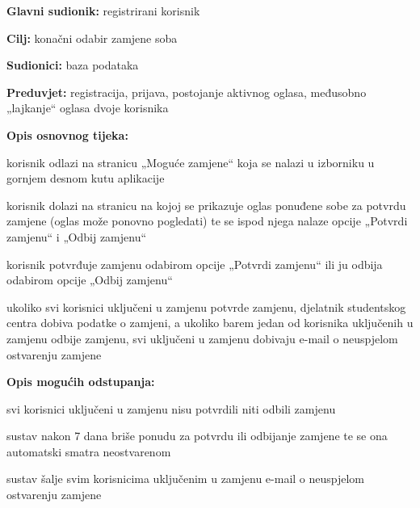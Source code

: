 \noindent {}
\begin{packed_item}
	
	\item \textbf{Glavni sudionik: } registrirani korisnik
	\item  \textbf{Cilj:}  konačni odabir zamjene soba
	\item  \textbf{Sudionici:} baza podataka
	\item  \textbf{Preduvjet:} registracija, prijava, postojanje aktivnog oglasa, međusobno „lajkanje“ oglasa dvoje korisnika
	\item  \textbf{Opis osnovnog tijeka:}
	
	\item[] \begin{packed_enum}
		
		\item korisnik odlazi na stranicu „Moguće zamjene“ koja se nalazi u izborniku u gornjem desnom kutu aplikacije
		\item korisnik dolazi na stranicu na kojoj se prikazuje oglas ponuđene sobe za potvrdu zamjene (oglas može ponovno pogledati) te se ispod njega nalaze opcije „Potvrdi zamjenu“ i „Odbij zamjenu“
		\item korisnik potvrđuje zamjenu odabirom opcije „Potvrdi zamjenu“ ili ju odbija odabirom opcije „Odbij zamjenu“
		\item ukoliko svi korisnici uključeni u zamjenu potvrde zamjenu, djelatnik studentskog centra dobiva podatke o zamjeni, a ukoliko barem jedan od korisnika uključenih u zamjenu odbije zamjenu, svi uključeni u zamjenu dobivaju e-mail o neuspjelom ostvarenju zamjene
		
	\end{packed_enum}
	
	\item  \textbf{Opis mogućih odstupanja:}
	
	\item[] \begin{packed_item}
		
		\item[3.a] svi korisnici uključeni u zamjenu nisu potvrdili niti odbili zamjenu
		\item[] \begin{packed_enum}
			
			\item sustav nakon 7 dana briše ponudu za potvrdu ili odbijanje zamjene te se ona automatski smatra neostvarenom
			\item sustav šalje svim korisnicima uključenim u zamjenu e-mail o neuspjelom ostvarenju zamjene 
			

\end{packed_enum}
\end{packed_item}
\end{packed_item}
